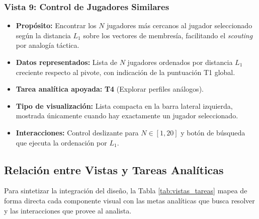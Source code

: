 \documentclass[conference]{IEEEtran}
\begin{document}
\subsubsection{Vista 9: Control de Jugadores Similares}
\begin{itemize}
    \item \textbf{Propósito:} Encontrar los $N$ jugadores más cercanos al jugador seleccionado según la distancia $L_1$ sobre los vectores de membresía, facilitando el \textit{scouting} por analogía táctica.
    \item \textbf{Datos representados:} Lista de $N$ jugadores ordenados por distancia $L_1$ creciente respecto al pivote, con indicación de la puntuación T1 global.
    \item \textbf{Tarea analítica apoyada:} \textbf{T4} (Explorar perfiles análogos).
    \item \textbf{Tipo de visualización:} Lista compacta en la barra lateral izquierda, mostrada únicamente cuando hay exactamente un jugador seleccionado.
    \item \textbf{Interacciones:} Control deslizante para $N \in [1,20]$ y botón de búsqueda que ejecuta la ordenación por $L_1$.
\end{itemize}

\subsection{Relación entre Vistas y Tareas Analíticas}

Para sintetizar la integración del diseño, la Tabla \ref{tab:vistas_tareas} mapea de forma directa cada componente visual con las metas analíticas que busca resolver y las interacciones que provee al analista.
\end{document}
